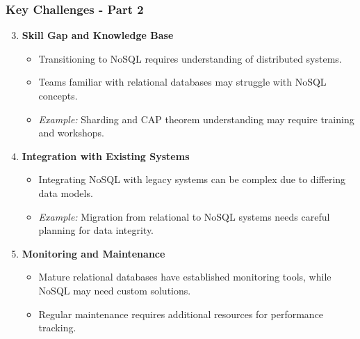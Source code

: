 \documentclass[aspectratio=169]{beamer}
\begin{document}
\begin{frame}[fragile]
    \frametitle{Key Challenges - Part 2}
    \begin{enumerate}
        \setcounter{enumi}{2} %
        \item \textbf{Skill Gap and Knowledge Base}
        \begin{itemize}
            \item Transitioning to NoSQL requires understanding of distributed systems.
            \item Teams familiar with relational databases may struggle with NoSQL concepts.
            \item \textit{Example:} Sharding and CAP theorem understanding may require training and workshops.
        \end{itemize}
        
        \item \textbf{Integration with Existing Systems}
        \begin{itemize}
            \item Integrating NoSQL with legacy systems can be complex due to differing data models.
            \item \textit{Example:} Migration from relational to NoSQL systems needs careful planning for data integrity.
        \end{itemize}
        
        \item \textbf{Monitoring and Maintenance}
        \begin{itemize}
            \item Mature relational databases have established monitoring tools, while NoSQL may need custom solutions.
            \item Regular maintenance requires additional resources for performance tracking.
        \end{itemize}
    \end{enumerate}
\end{frame}
\end{document}
